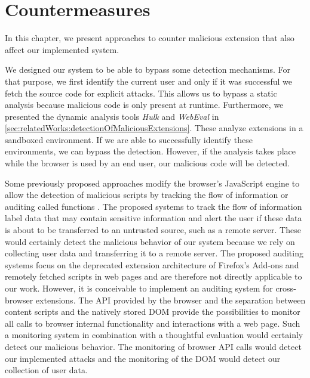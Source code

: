 
\chapter{Countermeasures}
\label{chp:countermeasures}

	In this chapter, we present approaches to counter malicious extension that also affect our implemented system.
	
	We designed our system to be able to bypass some detection mechanisms. For that purpose, we first identify the current user and only if it was successful we fetch the source code for explicit attacks. This allows us to bypass a static analysis because malicious code is only present at runtime. Furthermore, we presented the dynamic analysis tools \textit{Hulk} and \textit{WebEval} in \autoref{sec:relatedWorks:detectionOfMaliciousExtensions}. These analyze extensions in a sandboxed environment. If we are able to successfully identify these environments, we can bypass the detection. However, if the analysis takes place while the browser is used by an end user, our malicious code will be detected. 
	
	Some previously proposed approaches modify the browser's JavaScript engine to allow the detection of malicious scripts by tracking the flow of information \cite{Dhawan:2009:AIF:1723192.1723250, ndss2007xss} or auditing called functions \cite{Hallaraker:2005:DMJ:1078029.1078861, cs2015sentinel}. The proposed systems to track the flow of information label data that may contain sensitive information and alert the user if these data is about to be transferred to an untrusted source, such as a remote server. These would certainly detect the malicious behavior of our system because we rely on collecting user data and transferring it to a remote server. The proposed auditing systems focus on the deprecated extension architecture of Firefox's Add-ons and remotely fetched scripts in web pages and are therefore not directly applicable to our work. However, it is conceivable to implement an auditing system for cross-browser extensions. The API provided by the browser and the separation between content scripts and the natively stored DOM provide the possibilities to monitor all calls to browser internal functionality and interactions with a web page. Such a monitoring system in combination with a thoughtful evaluation would certainly detect our malicious behavior. The monitoring of browser API calls would detect our implemented attacks and the monitoring of the DOM would detect our collection of user data.


